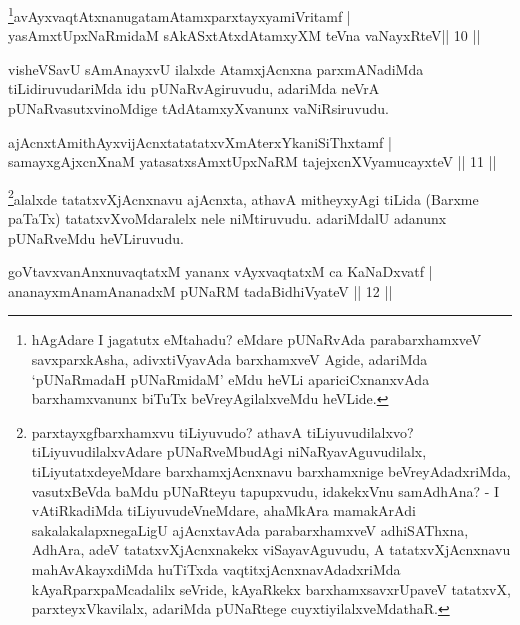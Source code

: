 \begin{shl}
\footnote{hAgAdare I jagatutx eMtahadu? eMdare pUNaRvAda parabarxhamxveV savxparxkAsha, adivxtiVyavAda barxhamxveV Agide, adariMda `pUNaRmadaH pUNaRmidaM' eMdu heVLi apariciCxnanxvAda barxhamxvanunx biTuTx beVreyAgilalxveMdu heVLide.}avAyxvaqtAtxnanugatamAtamxparxtayxyamiVritamf  | \\
yasAmxtUpxNaRmidaM sAkASxtAtxdAtamxyXM teVna vaNayxRteV\hfill ||  10 ||  
\end{shl}

\begin{artha}
visheVSavU sAmAnayxvU ilalxde AtamxjAcnxna parxmANadiMda tiLidiruvudariMda idu pUNaRvAgiruvudu, adariMda neVrA pUNaRvasutxvinoMdige tAdAtamxyXvanunx vaNiRsiruvudu.
\end{artha}

\begin{shl}
ajAcnxtAmithAyxvijAcnxtatatatxvXmAterxYkaniSiThxtamf  | \\
samayxgAjxcnXnaM yatasatxsAmxtUpxNaRM tajejxcnXVyamucayxteV \hfill||  11 ||  
\end{shl}


\begin{artha}
\footnote{parxtayxgfbarxhamxvu tiLiyuvudo? athavA tiLiyuvudilalxvo? tiLiyuvudilalxvAdare pUNaRveMbudAgi niNaRyavAguvudilalx, tiLiyutatxdeyeMdare barxhamxjAcnxnavu barxhamxnige beVreyAdadxriMda, vasutxBeVda baMdu pUNaRteyu tapupxvudu, idakekxVnu  samAdhAna? - I vAtiRkadiMda tiLiyuvudeVneMdare, ahaMkAra mamakArAdi sakalakalapxnegaLigU ajAcnxtavAda parabarxhamxveV adhiSAThxna, AdhAra, adeV tatatxvXjAcnxnakekx viSayavAguvudu, A tatatxvXjAcnxnavu mahAvAkayxdiMda huTiTxda vaqtitxjAcnxnavAdadxriMda kAyaRparxpaMcadalilx seVride, kAyaRkekx barxhamxsavxrUpaveV tatatxvX, parxteyxVkavilalx, adariMda pUNaRtege cuyxtiyilalxveMdathaR.}alalxde tatatxvXjAcnxnavu ajAcnxta, athavA mitheyxyAgi tiLida (Barxme paTaTx) tatatxvXvoMdaralelx nele niMtiruvudu. adariMdalU adanunx pUNaRveMdu heVLiruvudu.
\end{artha}


\begin{shl}
goVtavxvanAnxnuvaqtatxM yananx vAyxvaqtatxM ca KaNaDxvatf  | \\
ananayxmAnamAnanadxM  pUNaRM tadaBidhiVyateV \hfill||  12 ||  
\end{shl}

